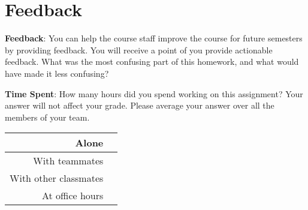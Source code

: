 \documentclass[12pt]{article}
\begin{document}
\clearpage
\section*{Feedback}

\textbf{Feedback}: You can help the course staff improve the course for future semesters by providing feedback. You will receive a point of you provide actionable feedback. What was the most confusing part of this homework, and what would have made it less confusing?
\begin{solution}[height=4cm]
\end{solution}

\noindent\textbf{Time Spent}: How many hours did you spend working on this assignment? Your answer will not affect your grade. Please average your answer over all the members of your team.
\begin{table}[H]
    \centering
    \begin{tabular}{r|c}
        Alone &  \hspace{3em} %
        \\ \hline
        With teammates & \hspace{3em} %
        \\ \hline
        With other classmates & \hspace{3em} %
        \\ \hline
        At office hours & \hspace{3em} %
        \\ \hline
    \end{tabular}
\end{table}
\end{document}
